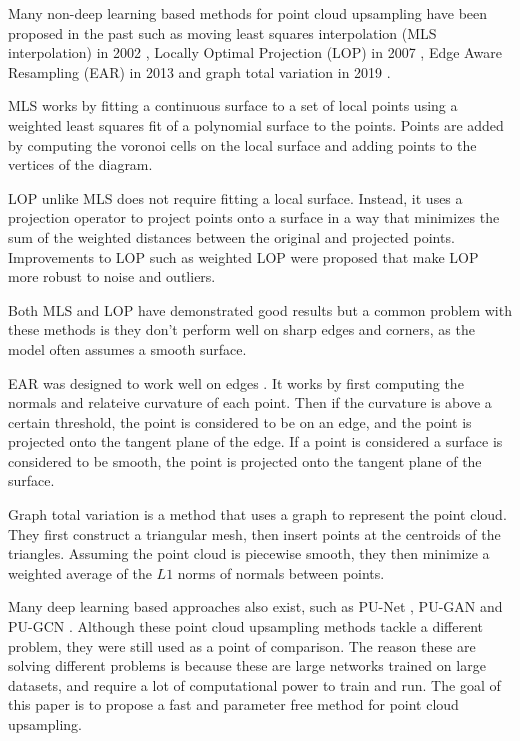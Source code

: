 Many non-deep learning based methods for point cloud upsampling have been proposed in the past such as moving least squares interpolation (MLS interpolation) in 2002 \cite{Alexa2003ComputingAR},
Locally Optimal Projection (LOP) in 2007 \cite{LOP}, Edge Aware Resampling (EAR) in 2013 \cite{EdgeAwareResampling} and graph total variation in 2019 \cite{GraphTotalVariation}.


MLS works by fitting a continuous surface to a set of local points using a weighted least squares fit of a polynomial surface to the points. 
Points are added by computing the voronoi cells on the local surface and adding points to the vertices of the diagram.

LOP unlike MLS does not require fitting a local surface. Instead, it uses a projection operator to project points onto a surface in a way that minimizes the sum of the weighted distances between the original and projected points. Improvements to LOP such as weighted LOP \cite{WLOP} were proposed that make LOP more robust to noise and outliers. 

Both MLS and LOP have demonstrated good results but a common problem with these methods is they don't perform well on sharp edges and corners, as the model often assumes a smooth surface.

EAR was designed to work well on edges \cite{EdgeAwareResampling}. 
It works by first computing the normals and relateive curvature of each point.
Then if the curvature is above a certain threshold, the point is considered to be on an edge, and the point is projected onto the tangent plane of the edge.
If a point is considered a surface is considered to be smooth, the point is projected onto the tangent plane of the surface.

Graph total variation is a method that uses a graph to represent the point cloud. 
They first construct a triangular mesh, then insert points at the centroids of the triangles. 
Assuming the point cloud is piecewise smooth, they then minimize a weighted average of the $L1$ norms 
of normals between points.

Many deep learning based approaches also exist, such as PU-Net \cite{PU-Net}, PU-GAN \cite{PU-GAN} and PU-GCN \cite{PU-GCN}. Although these point cloud upsampling methods tackle a different problem, they were still used as a point of comparison.
The reason these are solving different problems is because these are large networks trained on large datasets, and require a lot of computational power to train and run. The goal of this paper is to propose a fast and parameter free method for point cloud upsampling.

